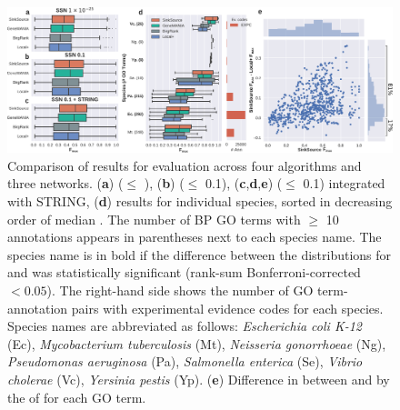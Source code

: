 \begin{figure}[H]
    \centering
    \includegraphics[width=\textwidth]{figs/fig2-expc-compare-eval-fmax-sinksource-localplus-bp-a0_95.pdf}
    \caption{
      Comparison of \fmax results for \loso evaluation across four algorithms and three networks.
      (\textbf{a}) \SSN (\eval $\le$ ),
      (\textbf{b}) \SSN (\eval $\le$ 0.1),
      (\textbf{c},\textbf{d},\textbf{e}) \SSN (\eval $\le$ 0.1) integrated with STRING,
      (\textbf{d}) \loso results for individual species, sorted in decreasing order of median \fmax. The number of BP GO terms with $\ge$ 10 annotations appears in parentheses next to each species name.  The species name is in bold if the difference between the distributions for \sinksource and \localplus was statistically significant (rank-sum Bonferroni-corrected \pval $< 0.05$). \protect The right-hand side shows the number of GO term-annotation pairs with experimental evidence codes for each species.
    Species names are abbreviated as follows:
    \textit{Escherichia coli K-12} (Ec),
    \textit{Mycobacterium tuberculosis} (Mt),
    \textit{Neisseria gonorrhoeae} (Ng),
    \textit{Pseudomonas aeruginosa} (Pa),
    \textit{Salmonella enterica} (Se),
    \textit{Vibrio cholerae} (Vc),
    \textit{Yersinia pestis} (Yp).
    (\textbf{e}) Difference in \fmax between \sinksource and \localplus by the \fmax of \sinksource for each GO term. 
    }
    \label{fig:loso-results-exp}
\end{figure}


